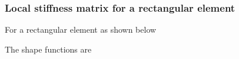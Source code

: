 \subsubsection*{Local stiffness matrix for a rectangular element}
For a rectangular element as shown below

\begin{center}
  
\end{center}

\newcommand{\shpf}{shape functions}
The \shpf{} are
\newcommand{\Ni}[1]{\ensuremath{N_i(x,y)}}
\newcommand{\Nij}[2]{\dX[#2]{#1}}
\def\g#1{\ensuremath{g_{#1}(y)}}
\def\f#1{\ensuremath{f_{#1}(x)}}
\newcommand{\vg}{
  \begin{bmatrix}
    \g2 \\ \g1
  \end{bmatrix}
}

